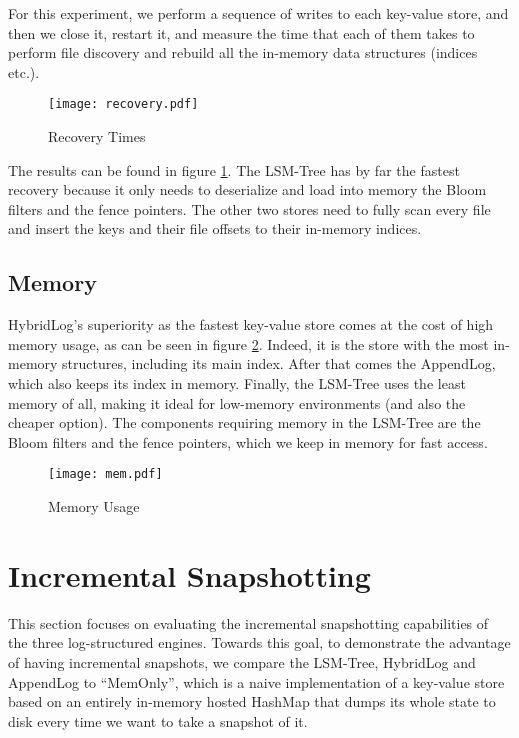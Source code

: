For this experiment, we perform a sequence of writes to each key-value store, and then we close it, restart it, and measure the time that each of them takes to perform file discovery and rebuild all the in-memory data structures (indices etc.).

\begin{figure}[h]
    \centering
    \texttt{[image: recovery.pdf]}
    \caption{Recovery Times}
    \label{fig:recovery}
\end{figure}

The results can be found in figure \ref{fig:recovery}. The LSM-Tree has by far the fastest recovery because it only needs to deserialize and load into memory the Bloom filters and the fence pointers. The other two stores need to fully scan every file and insert the keys and their file offsets to their in-memory indices.

\subsection{Memory}

HybridLog's superiority as the fastest key-value store comes at the cost of high memory usage, as can be seen in figure \ref{fig:comparison-memory}. Indeed, it is the store with the most in-memory structures, including its main index. After that comes the AppendLog, which also keeps its index in memory. Finally, the LSM-Tree uses the least memory of all, making it ideal for low-memory environments (and also the cheaper option). The components requiring memory in the LSM-Tree are the Bloom filters and the fence pointers, which we keep in memory for fast access.

\begin{figure}[h]
    \centering
    \texttt{[image: mem.pdf]}
    \caption{Memory Usage}
    \label{fig:comparison-memory}
\end{figure}

\section{Incremental Snapshotting}

This section focuses on evaluating the incremental snapshotting capabilities of the three log-structured engines. Towards this goal, to demonstrate the advantage of having incremental snapshots, we compare the LSM-Tree, HybridLog and AppendLog to ``MemOnly'', which is a naive implementation of a key-value store based on an entirely in-memory hosted HashMap that dumps its whole state to disk every time we want to take a snapshot of it.

